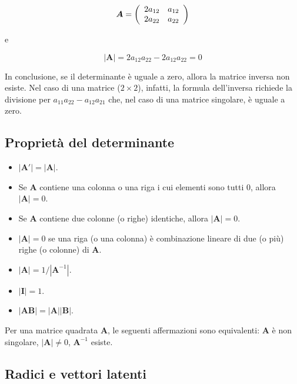 \documentclass[
  11pt,
]{krantz}
\theoremstyle{definition}
\theoremstyle{definition}
\theoremstyle{definition}
\theoremstyle{definition}
\theoremstyle{remark}
\begin{document}
\[\boldsymbol{A} =  \left( \begin{array}{c c}
2a_{12}& a_{12} \\
2a_{22} & a_{22} \end{array} \right)\]

e

\[|\boldsymbol{A}| = 2a_{12}a_{22}-2a_{12}a_{22}=0\]

In conclusione, se il determinante è uguale a zero, allora la matrice inversa non esiste. Nel caso di una matrice (\(2 \times 2\)), infatti, la formula dell'inversa richiede la divisione per \(a_{11}a_{22}-a_{12}a_{21}\) che, nel caso di una matrice singolare, è uguale a zero.

\hypertarget{proprietuxe0-del-determinante}{%
\subsection{Proprietà del determinante}\label{proprietuxe0-del-determinante}}

\begin{itemize}
\item
  \(|\boldsymbol{A}'| = |\boldsymbol{A}|\).
\item
  Se \(\boldsymbol{A}\) contiene una colonna o una riga i cui elementi sono tutti 0, allora \(|\boldsymbol{A}|=0\).
\item
  Se \(\boldsymbol{A}\) contiene due colonne (o righe) identiche, allora \(|\boldsymbol{A}|=0\).
\item
  \(|\boldsymbol{A}| = 0\) se una riga (o una colonna) è combinazione lineare di due (o più) righe (o colonne) di \(\boldsymbol{A}\).
\item
  \(|\boldsymbol{A}| = 1/|\boldsymbol{A}^{-1}|\).
\item
  \(|\boldsymbol{I}| = 1\).
\item
  \(|\boldsymbol{A} \boldsymbol{B}| = |\boldsymbol{A}| |\boldsymbol{B}|\).
\end{itemize}

Per una matrice quadrata \(\boldsymbol{A}\), le seguenti affermazioni sono equivalenti: \(\boldsymbol{A}\) è non singolare, \(|\boldsymbol{A}|\neq 0\), \(\boldsymbol{A}^{-1}\) esiste.

\hypertarget{radici-e-vettori-latenti}{%
\subsection{Radici e vettori latenti}\label{radici-e-vettori-latenti}}
\end{document}
